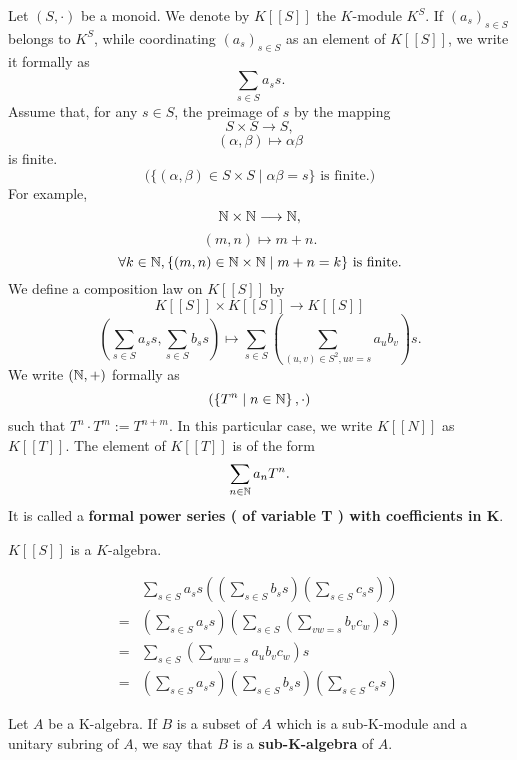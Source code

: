 \begin{exampleenv}
    Let $(S,\cdot)$ be a monoid. We denote by $K [\![S]\!]$ the $K$-module $K^S$. If $\left(a_s\right)_{s\in S}$ belongs to $K^S$, while coordinating $(a_s)_{s\in S}$ as an element of $K[\![S]\!]$, we write it formally as 
    $$\sum_{s\in S}a_s s.$$
    Assume that, for any $s\in S$, the preimage of $s$ by the mapping
    $$S\times S\longrightarrow S,$$
    $$(\alpha, \beta)\longmapsto \alpha\beta$$
    is finite.
    $$\text{(}\{\left(\alpha,\beta\right)\in S\times S\mid \alpha\beta=s\} \text{ is finite.}\text{)}$$
    For example, 
    $$\mathbb{N}\times \mathbb{N}\longrightarrow \mathbb{N},$$
    $$\left(m,n\right)\longmapsto m+n.$$
    $$\forall k\in \mathbb{N},\{(m,n)\in \mathbb{N}\times \mathbb{N}\mid m+n=k \} \text{ is finite.}$$
    We define a composition law on $K[\![S]\!]$ by
    $$K[\![S]\!]\times K[\![S]\!]\longrightarrow K[\![S]\!]$$
    $$\left(\sum_{s\in S}a_ss,\sum_{s\in S}b_ss\right)\longmapsto \sum_{s\in S}\left(\sum_{(u,v)\in S^2,uv=s}a_ub_v\right)s.$$
    We write $(\mathbb{N},+)$ formally as 
    $$\left(\left\{T^n\mid n\in \mathbb{N}\right\},\cdot\right)$$
    such that  $T^n\cdot T^m:=T^{n+m}$. In this particular case, we write $K [\![N]\!]$ as $K[\![T]\!]$. The element of $K[\![T]\!]$ is of the form
    $$\sum_{n\in \mathbb{N}}a_nT^n.$$
    It is called a \textbf{formal power series ( of variable T ) with coefficients in K}.

\end{exampleenv}
\begin{propositionenv}
    $K[\![S]\!]$ is a $K$-algebra.
\end{propositionenv}
\begin{proofenv}
    \begin{align*}
       & \sum_{s\in S} a_s s \left( \left( \sum_{s\in S} b_s s \right) \left( \sum_{s\in S} c_s s \right) \right)\\
        =&\left(\sum_{s\in S} a_s s \right)\left( \sum_{s\in S} \left(\sum_{vw=s}b_vc_w\right) s \right)\\
        = &\sum_{s\in S} \left( \sum_{uvw=s} a_u b_v c_w \right)s\\
        =& \left( \sum_{s\in S} a_s s \right)\left( \sum_{s\in S} b_s s \right) \left( \sum_{s\in S} c_s s \right) 
    \end{align*}


\end{proofenv}
\begin{definitionenv}
    Let $A$ be a K-algebra. If $B$ is a subset of $A$ which is a sub-K-module and a unitary subring of $A$, we say that $B$ is a \textbf{sub-K-algebra} of $A$.
\end{definitionenv}
